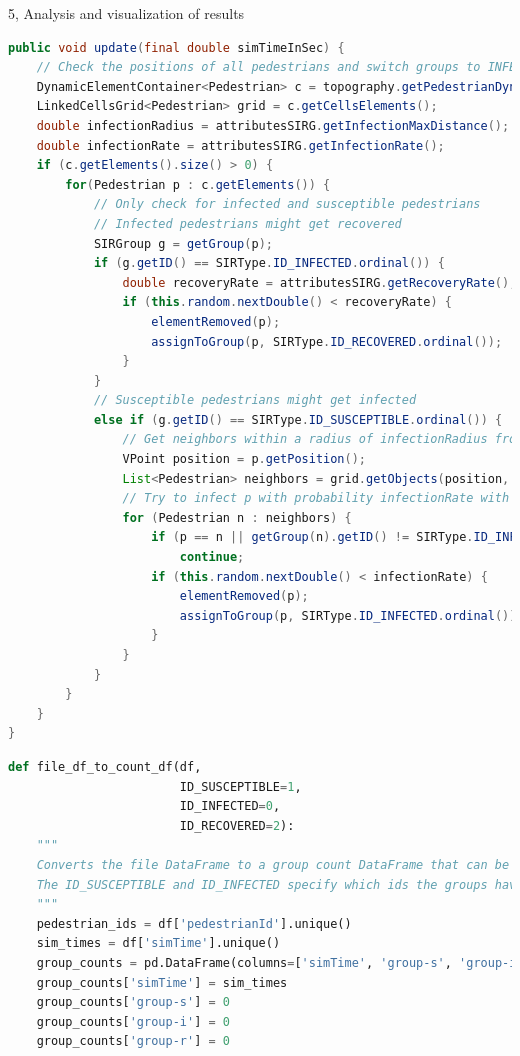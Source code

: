 \documentclass[10pt,a4paper]{article}
\begin{document}
\begin{task}{5, Analysis and visualization of results}
\begin{lstlisting}[language = Java, caption = \text{New version of the \textit{update()} method, with a implementation of the recovered state}, label={recovered_update}]
public void update(final double simTimeInSec) {
	// Check the positions of all pedestrians and switch groups to INFECTED (or REMOVED).
	DynamicElementContainer<Pedestrian> c = topography.getPedestrianDynamicElements();
	LinkedCellsGrid<Pedestrian> grid = c.getCellsElements();
	double infectionRadius = attributesSIRG.getInfectionMaxDistance();
	double infectionRate = attributesSIRG.getInfectionRate();
	if (c.getElements().size() > 0) {
		for(Pedestrian p : c.getElements()) {
			// Only check for infected and susceptible pedestrians
			// Infected pedestrians might get recovered
			SIRGroup g = getGroup(p);
			if (g.getID() == SIRType.ID_INFECTED.ordinal()) {
				double recoveryRate = attributesSIRG.getRecoveryRate();
				if (this.random.nextDouble() < recoveryRate) {
					elementRemoved(p);
					assignToGroup(p, SIRType.ID_RECOVERED.ordinal());
				}
			}
			// Susceptible pedestrians might get infected
			else if (g.getID() == SIRType.ID_SUSCEPTIBLE.ordinal()) {
				// Get neighbors within a radius of infectionRadius from the position of the Pedestrian p
				VPoint position = p.getPosition();
				List<Pedestrian> neighbors = grid.getObjects(position, infectionRadius);
				// Try to infect p with probability infectionRate with as many attempts as infected neighbors are there
				for (Pedestrian n : neighbors) {
					if (p == n || getGroup(n).getID() != SIRType.ID_INFECTED.ordinal())
						continue;
					if (this.random.nextDouble() < infectionRate) {
						elementRemoved(p);
						assignToGroup(p, SIRType.ID_INFECTED.ordinal());
					}
				}
			}
		}
	}
}
    \end{lstlisting}
    
    \newpage
    
    \begin{lstlisting}[language = Python, caption={New version of the \textit{file\_df\_to\_count\_df()} method, which now counts the added recovered group}, label={new_df}]
def file_df_to_count_df(df,
                        ID_SUSCEPTIBLE=1,
                        ID_INFECTED=0,
                        ID_RECOVERED=2):
    """
    Converts the file DataFrame to a group count DataFrame that can be plotted.
    The ID_SUSCEPTIBLE and ID_INFECTED specify which ids the groups have in the Vadere processor file.
    """
    pedestrian_ids = df['pedestrianId'].unique()
    sim_times = df['simTime'].unique()
    group_counts = pd.DataFrame(columns=['simTime', 'group-s', 'group-i', 'group-r'])
    group_counts['simTime'] = sim_times
    group_counts['group-s'] = 0
    group_counts['group-i'] = 0
    group_counts['group-r'] = 0


\end{lstlisting}
\end{task}
\end{document}
